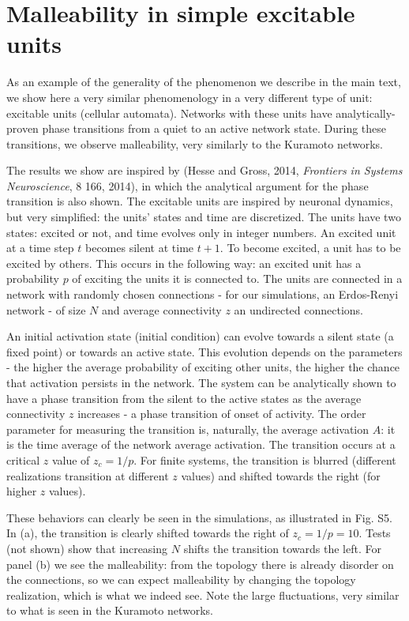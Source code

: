 \documentclass[reprint,onecolumn,superscriptaddress,showpacs,amsmath,amssymb,aps,prx,floatfix,]{revtex4-2}
\begin{document}
\section{Malleability in simple excitable units}
As an example of the generality of the phenomenon we describe in the main text, we show here a very similar phenomenology in a very different type of unit: excitable units (cellular automata). Networks with these units have analytically-proven phase transitions from a quiet to an active network state. During these transitions, we observe malleability, very similarly to the Kuramoto networks. 

The results we show are inspired by (Hesse and Gross, 2014, \textit{Frontiers in Systems Neuroscience}, 8 166, 2014), in which the analytical argument for the phase transition is also shown.
The excitable units are inspired by neuronal dynamics, but very simplified: the units' states and time are discretized. The units have two states: excited or not, and time evolves only in integer numbers. An excited unit at a time step $t$ becomes silent at time $t+1$. To become excited, a unit has to be excited by others. This occurs in the following way: an excited unit has a probability $p$ of exciting the units it is connected to. The units are connected in a network with randomly chosen connections - for our simulations, an Erdos-Renyi network - of size $N$ and average connectivity $z$ an undirected connections. 

An initial activation state (initial condition) can evolve towards a silent state (a fixed point) or towards an active state. This evolution depends on the parameters - the higher the average probability of exciting other units, the higher the chance that activation persists in the network.  The system can be analytically shown to have a phase transition from the silent to the active states as the average connectivity $z$ increases - a phase transition of onset of activity. The order parameter for measuring the transition is, naturally, the average activation $A$: it is the time average of the network average activation. The transition occurs at a critical $z$ value of $z_c = 1/p$. For finite systems, the transition is blurred (different realizations transition at different $z$ values) and shifted towards the right (for higher $z$ values). 

These behaviors can clearly be seen in the simulations, as illustrated in Fig. S5. In (a), the transition is clearly shifted towards the right of $z_c = 1/p = 10$. Tests (not shown) show that increasing $N$ shifts the transition towards the left. For panel (b) we see the malleability: from the topology there is already disorder on the connections, so we can expect malleability by changing the topology realization, which is what we indeed see. Note the large fluctuations, very similar to what is seen in the Kuramoto networks.
\end{document}
